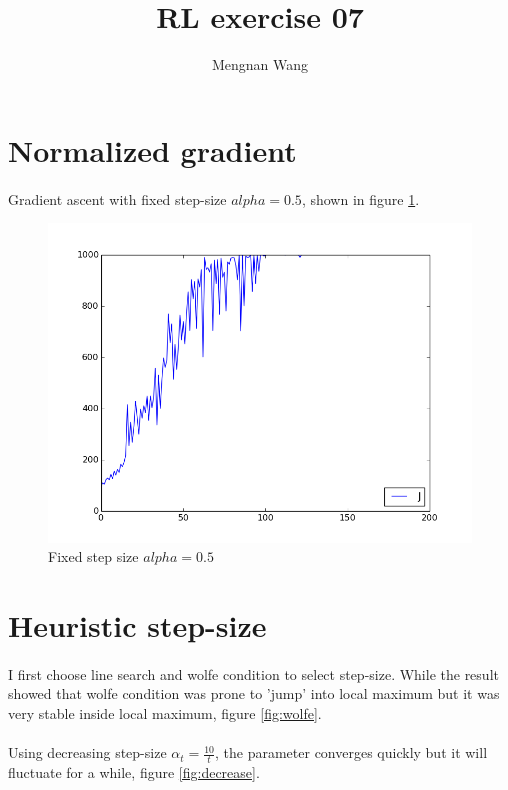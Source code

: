 \documentclass[]{article}
\title{RL exercise 07 }
\author{Mengnan Wang}
\begin{document}
\maketitle

\section{Normalized gradient}
\paragraph{}Gradient ascent with fixed step-size $alpha=0.5$, shown in figure \ref{fig:fix-alpha}.
\begin{figure}[!htb]
	\centering
	\includegraphics[width=\linewidth]{FD.png}
	\caption{\label{fig:fix-alpha}Fixed step size $alpha=0.5$}
	\end{figure}
\section{Heuristic step-size}
\paragraph{}I first choose line search and wolfe condition to select step-size. While the result showed that wolfe condition was prone to 'jump' into local maximum but it was very stable inside local maximum, figure \ref{fig:wolfe}. 
\paragraph{}Using decreasing step-size $\alpha_t=\frac{10}{t}$, the parameter converges quickly but it will fluctuate for a while, figure \ref{fig:decrease}.
\end{document}
